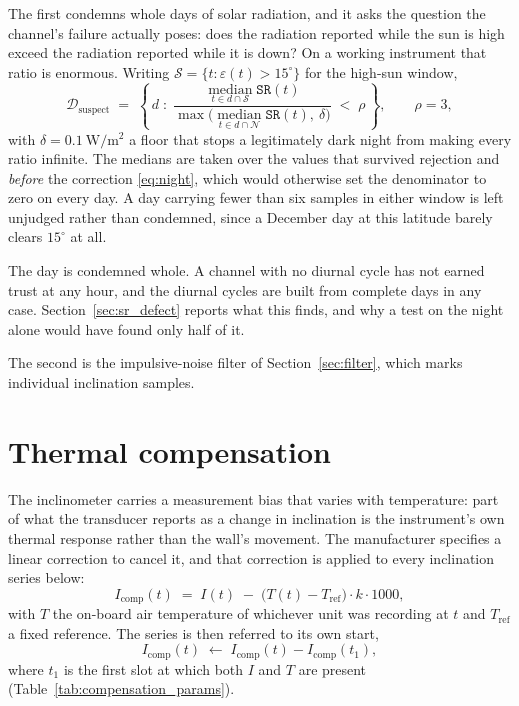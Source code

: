 \documentclass[11pt,a4paper]{article}
\begin{document}
The first condemns whole days of solar radiation, and it asks the question the channel's failure actually poses: does the radiation reported while the sun is high exceed the radiation reported while it is down? On a working instrument that ratio is enormous. Writing $\mathcal{S} = \{t : \varepsilon(t) > 15^{\circ}\}$ for the high-sun window,
\begin{equation}
\label{eq:srsuspect}
\mathcal{D}_{\mathrm{suspect}} \;=\;
\left\{\, d \;:\;
\frac{\operatorname*{median}_{t \in d \cap \mathcal{S}} \texttt{SR}(t)}
     {\max\bigl(\operatorname*{median}_{t \in d \cap \mathcal{N}} \texttt{SR}(t),\ \delta\bigr)}
\;<\; \rho \,\right\},
\qquad \rho = 3,
\end{equation}
with $\delta = 0.1\ \mathrm{W/m^2}$ a floor that stops a legitimately dark night from making every ratio infinite. The medians are taken over the values that survived rejection and \emph{before} the correction \eqref{eq:night}, which would otherwise set the denominator to zero on every day. A day carrying fewer than six samples in either window is left unjudged rather than condemned, since a December day at this latitude barely clears $15^{\circ}$ at all.

The day is condemned whole. A channel with no diurnal cycle has not earned trust at any hour, and the diurnal cycles are built from complete days in any case. Section~\ref{sec:sr_defect} reports what this finds, and why a test on the night alone would have found only half of it.

The second is the impulsive-noise filter of Section~\ref{sec:filter}, which marks individual inclination samples.

\section{Thermal compensation}
\label{sec:compensation}

The inclinometer carries a measurement bias that varies with temperature: part of what the transducer reports as a change in inclination is the instrument's own thermal response rather than the wall's movement. The manufacturer specifies a linear correction to cancel it, and that correction is applied to every inclination series below:
\begin{equation}
\label{eq:comp}
I_{\mathrm{comp}}(t) \;=\; I(t) \;-\; \bigl(T(t) - T_{\mathrm{ref}}\bigr)
\cdot k \cdot 1000 ,
\end{equation}
with $T$ the on-board air temperature of whichever unit was recording at $t$ and $T_{\mathrm{ref}}$ a fixed reference. The series is then referred to its own start,
\begin{equation}
\label{eq:anchor}
I_{\mathrm{comp}}(t) \;\leftarrow\; I_{\mathrm{comp}}(t)
- I_{\mathrm{comp}}(t_1),
\end{equation}
where $t_1$ is the first slot at which both $I$ and $T$ are present (Table~\ref{tab:compensation_params}).
\end{document}
